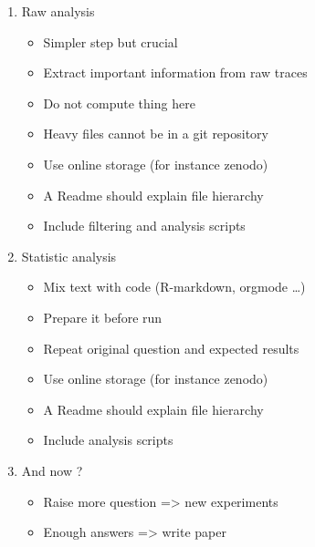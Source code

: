 \begin{itemize}
\begin{enumerate}
            \item Raw analysis
                \begin{itemize}
                    \item Simpler step but crucial
                    \item Extract important information from raw traces
                    \item Do not compute thing here
                    \item Heavy files cannot be in a git repository
                    \item Use online storage (for instance zenodo)
                    \item A Readme should explain file hierarchy
                    \item Include filtering and analysis scripts
                \end{itemize}
            \item Statistic analysis
                \begin{itemize}
                    \item Mix text with code (R-markdown, orgmode \ldots)
                    \item Prepare it before run
                    \item Repeat original question and expected results
                    \item Use online storage (for instance zenodo)
                    \item A Readme should explain file hierarchy
                    \item Include analysis scripts
                \end{itemize}
            \item And now ?
                \begin{itemize}
                    \item Raise more question => new experiments
                    \item Enough answers => write paper
                \end{itemize}
        \end{enumerate}
\end{itemize}

